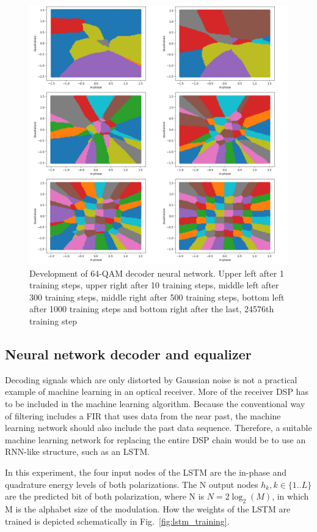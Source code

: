 \documentclass[journal,10pt,twoside, a4paper]{IEEEtran}
\begin{document}
\begin{figure}
    \centering
    \includegraphics[width=0.9\linewidth]{Thesis/images/linear.jpg}
    \caption{Development of 64-QAM decoder neural network. Upper left after 1 training steps, upper right after 10 training steps, middle left after 300 training steps, middle right after 500 training steps, bottom left after 1000 training steps and bottom right after the last, 24576th training step}
    \label{fig:linear}
\end{figure}

\subsection{Neural network decoder and equalizer}
Decoding signals which are only distorted by Gaussian noise is not a practical example of machine learning in an optical receiver. More of the receiver DSP has to be included in the machine learning algorithm. Because the conventional way of filtering includes a FIR that uses data from the near past, the machine learning network should also include the past data sequence. Therefore, a suitable machine learning network for replacing the entire DSP chain would be to use an RNN-like structure, such as an LSTM.

 In this experiment, the four input nodes of the LSTM are the in-phase and quadrature energy levels of both polarizations. The N output nodes $h_k, k\in\{1..L\}$ are the predicted bit of both polarization, where N is $N = 2\log_2(M)$, in which M is the alphabet size of the modulation. How the weights of the LSTM are trained is depicted schematically in Fig.~\ref{fig:lstm_training}.
\end{document}
